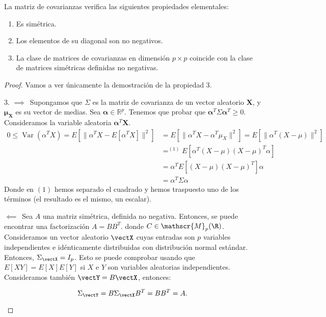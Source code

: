 \begin{nprop}
  La matriz de covarianzas verifica las siguientes propiedades elementales:
  \begin{enumerate}
    \item Es simétrica.
    \item Los elementos de su diagonal son no negativos.
    \item La clase de matrices de covarianzas en dimensión $p\times p$ coincide con la clase de matrices simétricas definidas no negativas.
    \end{enumerate}
  \end{nprop}
\begin{proof}
  Vamos a ver únicamente la demostración de la propiedad 3.
  \begin{nlist}
    \item[3.] $\boxed{\implies}\,$ Supongamos que $\Sigma$ es la matriz de covarianza de un vector aleatorio $\boldsymbol X$, y $\boldsymbol \mu_{\boldsymbol X}$ es su vector de medias. Sea $\boldsymbol \alpha \in \mathbb R^p$. Tenemos que probar que $\boldsymbol \alpha^T \Sigma \boldsymbol \alpha^T \geq 0$. Consideramos la variable aleatoria $\boldsymbol \alpha^T \boldsymbol X$. \begin{align*}
      0 \leq \operatorname{Var}(\alpha^T X) = E\left[\|\alpha^T X - E[\alpha^T X]\|^2\right] &= E\left[\|\alpha^T X - \alpha^T \mu_X\|^2\right] = E\left[\|\alpha^T(X-\mu)\|^2\right]\\ 
        &=^{(1)} E\left[\alpha^T(X-\mu)(X-\mu)^T \alpha\right] \\
        &= \alpha^T E\left[(X-\mu)(X-\mu)^T\right] \alpha \\
        &= \alpha^T \Sigma \alpha
    \end{align*} Donde en $(1)$ hemos separado el cuadrado y hemos traspuesto uno de los términos (el resultado es el mismo, un escalar).

    $\boxed{\impliedby}\,$ Sea $A$ una matriz simétrica, definida no negativa. Entonces, se puede encontrar una factorización $A = B B^T$. donde $C \in \mathscr{M}_{p}(\R)$.
    Consideramos un vector aleatorio $\vectX$ cuyas entradas son $p$ variables independientes e idénticamente distribuidas con distribución normal estándar. Entonces, $\Sigma_{\vectX} = I_p$. Esto se puede comprobar usando que $E[XY] = E[X]E[Y]$ si $X$ e $Y$ son variables aleatorias independientes. Consideramos también $\vectY = B\vectX$, entonces:

    \[
       \Sigma_{\vectY} = B\Sigma_{\vectX} B^T = B B^T = A
    .\]

  \end{nlist}
\end{proof}

